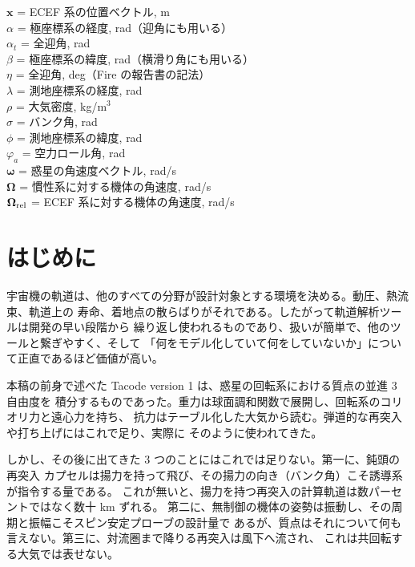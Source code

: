 \documentclass[11pt,a4paper,dvipdfmx]{jsarticle}
\newcommand{\bx}{{\boldsymbol x}}
\newcommand{\bOm}{{\boldsymbol \Omega}}
\newcommand{\bom}{{\boldsymbol \omega}}
\begin{document}
\begin{tabbing}
	$\bx$      \> = \> ECEF 系の位置ベクトル, m \\
	$\alpha$   \> = \> 極座標系の経度, rad（迎角にも用いる） \\
	$\alpha_t$ \> = \> 全迎角, rad \\
	$\beta$    \> = \> 極座標系の緯度, rad（横滑り角にも用いる） \\
	$\eta$     \> = \> 全迎角, deg（Fire の報告書の記法） \\
	$\lambda$  \> = \> 測地座標系の経度, rad \\
	$\rho$     \> = \> 大気密度, kg/m$^3$ \\
	$\sigma$   \> = \> バンク角, rad \\
	$\phi$     \> = \> 測地座標系の緯度, rad \\
	$\varphi_a$ \> = \> 空力ロール角, rad \\
	$\bom$     \> = \> 惑星の角速度ベクトル, rad/s \\
	$\bOm$     \> = \> 慣性系に対する機体の角速度, rad/s \\
	$\bOm_{\rm rel}$ \> = \> ECEF 系に対する機体の角速度, rad/s \\
\end{tabbing}

\section{はじめに}

宇宙機の軌道は、他のすべての分野が設計対象とする環境を決める。動圧、熱流束、軌道上の
寿命、着地点の散らばりがそれである。したがって軌道解析ツールは開発の早い段階から
繰り返し使われるものであり、扱いが簡単で、他のツールと繋ぎやすく、そして
「何をモデル化していて何をしていないか」について正直であるほど価値が高い。

本稿の前身で述べた Tacode version 1 は、惑星の回転系における質点の並進 3 自由度を
積分するものであった。重力は球面調和関数で展開し、回転系のコリオリ力と遠心力を持ち、
抗力はテーブル化した大気から読む。弾道的な再突入や打ち上げにはこれで足り、実際に
そのように使われてきた。

しかし、その後に出てきた 3 つのことにはこれでは足りない。第一に、鈍頭の再突入
カプセルは揚力を持って飛び、その揚力の向き（バンク角）こそ誘導系が指令する量である。
これが無いと、揚力を持つ再突入の計算軌道は数パーセントではなく数十 km ずれる。
第二に、無制御の機体の姿勢は振動し、その周期と振幅こそスピン安定プローブの設計量で
あるが、質点はそれについて何も言えない。第三に、対流圏まで降りる再突入は風下へ流され、
これは共回転する大気では表せない。
\end{document}
